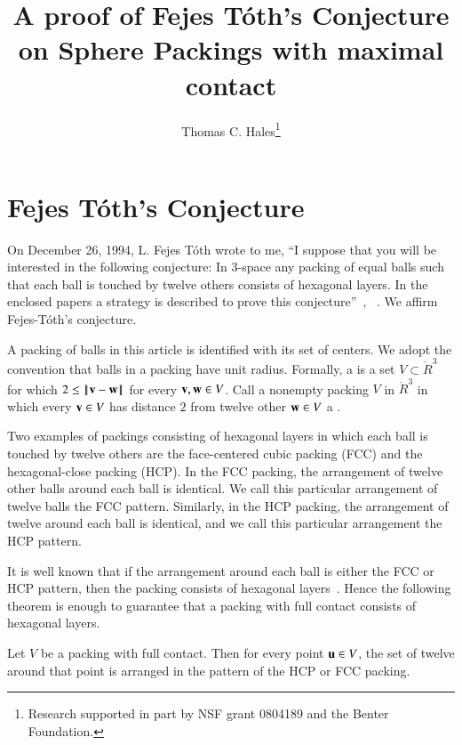 \documentclass{llncs}
\begin{document}
\title{A proof of Fejes T\'oth's  Conjecture on Sphere Packings with
maximal contact}
\author{Thomas C. Hales\thanks{{Research supported in part by 
NSF grant 0804189 and the Benter Foundation.}}}
\maketitle


\section{Fejes T\'oth's Conjecture}


On December 26, 1994, L. Fejes T\'oth wrote to me, ``I suppose that you will
be interested in the following conjecture: In $3$-space any packing of
equal balls such that each ball is touched by twelve others consists
of hexagonal layers.  In the enclosed papers a strategy is described
to prove this conjecture''~\cite{Fejes-Toth:89},
~\cite{Fejes-Toth:69}.  We affirm Fejes-T\'oth's conjecture.  


A packing of balls in this article is identified with its set of centers.  We adopt the convention that balls in a packing have unit radius.  Formally, a  is a set $V\subset\ring{R}^3$ for which $2\le\norm{\v}{\w}$ for every ${\mathbf v},{\mathbf w}\in V$.  Call a nonempty packing $V$ in $\ring{R}^3$ in which every ${\mathbf v}\in V$ has distance $2$ from twelve other ${\mathbf w}\in V$ a .

Two examples of packings consisting of hexagonal layers in which each ball is touched by twelve others are the face-centered cubic packing (FCC) and the hexagonal-close packing (HCP).  In the FCC packing, the arrangement of twelve other balls around each ball is identical.  We call this particular arrangement of twelve balls the FCC pattern.  Similarly, in the HCP packing, the arrangement of twelve around each ball is identical, and we call this particular arrangement the HCP pattern.

It is well known that if the
arrangement around each ball is either the FCC or HCP pattern, then
the packing consists of hexagonal layers~\cite[Sec.~1.3]{DSP}.
Hence the following theorem
is enough to guarantee that a packing with full contact consists of
hexagonal layers.  
%
%


\begin{theorem}\label{thm:fc} 
  Let $V$ be a packing with full contact.  Then for every point ${\mathbf u}\in
  V$, the set of twelve around that point is arranged in the pattern
  of the HCP or FCC packing.
\end{theorem}
%
%
%
\end{document}
